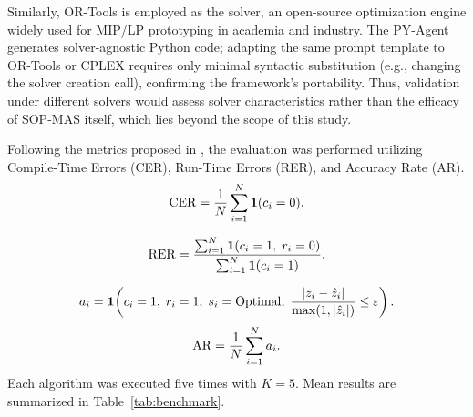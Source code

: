 \documentclass[preprint,12pt]{elsarticle}
\begin{document}
Similarly, OR-Tools is employed as the solver, an open-source optimization engine widely used for MIP/LP prototyping in academia and industry. The PY-Agent generates solver-agnostic Python code; adapting the same prompt template to OR-Tools or CPLEX requires only minimal syntactic substitution (e.g., changing the solver creation call), confirming the framework's portability. Thus, validation under different solvers would assess solver characteristics rather than the efficacy of SOP-MAS itself, which lies beyond the scope of this study.

Following the metrics proposed in \citet{xiaoChainofExpertsWhenLLMs2023}, the evaluation was performed utilizing Compile-Time Errors (CER), Run-Time Errors (RER), and Accuracy Rate (AR). 
\begin{equation}
\mathrm{CER}=\frac{1}{N}\sum_{i=1}^{N}\mathbf{1}(c_i=0).
\end{equation}


\begin{equation}
\mathrm{RER}=\frac{\sum_{i=1}^{N}\mathbf{1}(c_i=1,\; r_i=0)}{\sum_{i=1}^{N}\mathbf{1}(c_i=1)}.
\end{equation}

\begin{equation}
a_i=\mathbf{1}\!\left(c_i=1,\; r_i=1,\; s_i=\mathrm{Optimal},\; \frac{|z_i-\hat z_i|}{\max(1,|\hat z_i|)}\le \varepsilon\right).
\end{equation}
\begin{equation}
\mathrm{AR}=\frac{1}{N}\sum_{i=1}^{N} a_i.
\end{equation}
 Each algorithm was executed five times with $K=5$. Mean results are summarized in Table~\ref{tab:benchmark}.

\end{document}
